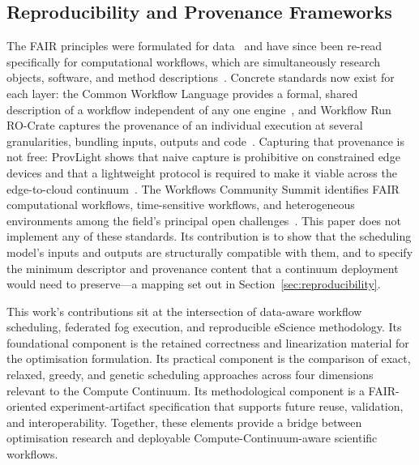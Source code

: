 \subsection{Reproducibility and Provenance Frameworks}
\label{subsec:rw_fair}

The FAIR principles were formulated for data~\cite{wilkinson2016fair} and have since been re-read
specifically for computational workflows, which are simultaneously research objects, software, and
method descriptions~\cite{swilkinson2025fairworkflows}. Concrete standards now exist for each
layer: the Common Workflow Language provides a formal, shared description of a workflow independent
of any one engine~\cite{crusoe2022cwl}, and Workflow Run RO-Crate captures the provenance of an
individual execution at several granularities, bundling inputs, outputs and
code~\cite{leo2024workflowruncrate}. Capturing that provenance is not free: ProvLight shows that
naive capture is prohibitive on constrained edge devices and that a lightweight protocol is
required to make it viable across the edge-to-cloud continuum~\cite{rosendo2023provlight}. The
Workflows Community Summit identifies FAIR computational workflows, time-sensitive workflows, and
heterogeneous environments among the field's principal open challenges~\cite{workflowssummit2024}.
This paper does not implement any of these standards. Its contribution is to show that the
scheduling model's inputs and outputs are structurally compatible with them, and to specify the
minimum descriptor and provenance content that a continuum deployment would need to preserve---a
mapping set out in Section~\ref{sec:reproducibility}.



This work's contributions sit at the intersection of data-aware workflow scheduling, federated fog execution, and reproducible eScience methodology. Its foundational component is the retained correctness and linearization material for the optimisation formulation. Its practical component is the comparison of exact, relaxed, greedy, and genetic scheduling approaches across four dimensions relevant to the Compute Continuum. Its methodological component is a FAIR-oriented experiment-artifact specification that supports future reuse, validation, and interoperability. Together, these elements provide a bridge between optimisation research and deployable Compute-Continuum-aware scientific workflows.
